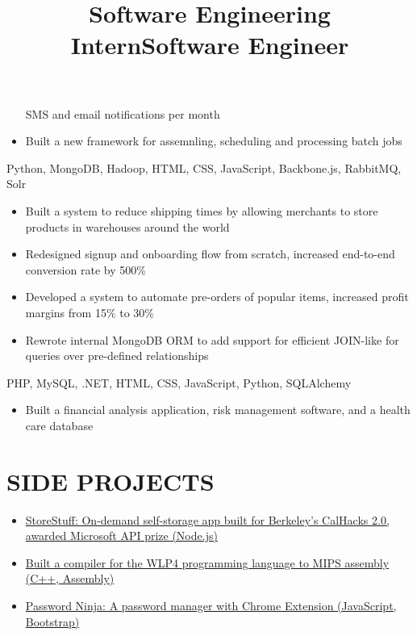 \documentclass[]{res}
\begin{document}
\begin{resume}
\begin{position}
\begin{itemize}
        SMS and email notifications per month
      \item Built a new framework for assemnling, scheduling and processing batch jobs
    \end{itemize}
  \end{position}
  \title{Software Engineering Intern}
  \begin{position}
    \begin{description}
      \item Python, MongoDB, Hadoop, HTML, CSS, JavaScript, Backbone.js, RabbitMQ, Solr
    \end{description}
    \begin{itemize}
      \item Built a system to reduce shipping times by allowing merchants to store products in warehouses
        around the world
      \item Redesigned signup and onboarding flow from scratch, increased end-to-end conversion rate by 500\%
      \item Developed a system to automate pre-orders of popular items, increased profit margins from 15\% to 30\%
      \item Rewrote internal MongoDB ORM to add support for efficient JOIN-like for queries over pre-defined relationships
    \end{itemize}
  \end{position}
  \title{Software Engineer}
  \begin{position}
    \begin{description}
      \item PHP, MySQL, .NET, HTML, CSS, JavaScript, Python, SQLAlchemy
    \end{description}
    \begin{itemize}
      \item Built a financial analysis application, risk management software, and a health care database
    \end{itemize}
  \end{position}

\section{SIDE PROJECTS}
  \begin{itemize}
    \item \href{https://github.com/paulashbourne/storestuff}
      {StoreStuff: On-demand self-storage app built for Berkeley's CalHacks 2.0, awarded Microsoft API prize (Node.js)}
    \item \href{https://github.com/paulashbourne/wlp4compiler}
      {Built a compiler for the WLP4 programming language to MIPS assembly (C++, Assembly)}
    \item \href{http://password-ninja.com/}
      {Password Ninja: A password manager with Chrome Extension (JavaScript, Bootstrap)}
  \end{itemize}


\end{resume}
\end{document}
